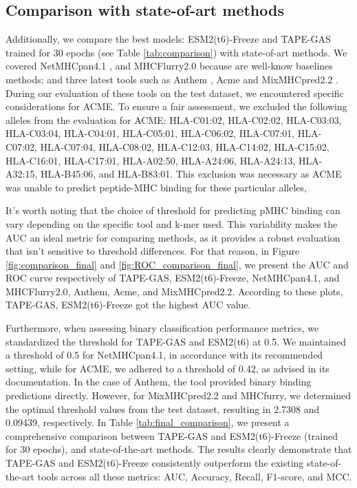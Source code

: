 \subsection{Comparison with state-of-art methods}
Additionally, we compare the best models: ESM2(t6)-Freeze and TAPE-GAS trained for 30 epochs (see Table \ref{tab:comparison}) with state-of-art methods. We covered NetMHCpan4.1 \cite{reynisson2020netmhcpan}, and MHCFlurry2.0 \cite{o2020mhcflurry} because are well-know baselines methods; and three latest tools such as Anthem \cite{mei2021anthem},  Acme \cite{hu2019acme} and MixMHCpred2.2  \cite{gfeller2023improved}. 
During our evaluation of these tools on the test dataset, we encountered specific considerations for ACME. To ensure a fair assessment, we excluded the following alleles from the evaluation for ACME: HLA-C01:02, HLA-C02:02, HLA-C03:03, HLA-C03:04, HLA-C04:01, HLA-C05:01, HLA-C06:02, HLA-C07:01, HLA-C07:02, HLA-C07:04, HLA-C08:02, HLA-C12:03, HLA-C14:02, HLA-C15:02, HLA-C16:01, HLA-C17:01, HLA-A02:50, HLA-A24:06, HLA-A24:13, HLA-A32:15, HLA-B45:06, and HLA-B83:01. This exclusion was necessary as ACME was unable to predict peptide-MHC binding for these particular alleles,

It's worth noting that the choice of threshold for predicting pMHC binding can vary depending on the specific tool and k-mer used. This variability makes the AUC an ideal metric for comparing methods, as it provides a robust evaluation that isn't sensitive to threshold differences. For that reason, in  Figure \ref{fig:comparison_final} and \ref{fig:ROC_comparison_final}, we present the AUC and ROC curve respectively of TAPE-GAS, ESM2(t6)-Freeze, NetMHCpan4.1, and MHCFlurry2.0, Anthem,  Acme, and MixMHCpred2.2. According to these plots, TAPE-GAS, ESM2(t6)-Freeze got the highest AUC value.

Furthermore, when assessing binary classification performance metrics, we standardized the threshold for TAPE-GAS and ESM2(t6) at 0.5. We maintained a threshold of 0.5 for NetMHCpan4.1, in accordance with its recommended setting, while for ACME, we adhered to a threshold of 0.42, as advised in its documentation. In the case of Anthem, the tool provided binary binding predictions directly. However, for MixMHCpred2.2 and MHCfurry, we determined the optimal threshold values from the test dataset, resulting in 2.7308 and 0.09439, respectively. In Table \ref{tab:final_comparison}, we present a comprehensive comparison between TAPE-GAS and ESM2(t6)-Freeze (trained for 30 epochs), and state-of-the-art methods. The results clearly demonstrate that TAPE-GAS and ESM2(t6)-Freeze consistently outperform the existing state-of-the-art tools across all these metrics: AUC, Accuracy, Recall, F1-score, and MCC. 


